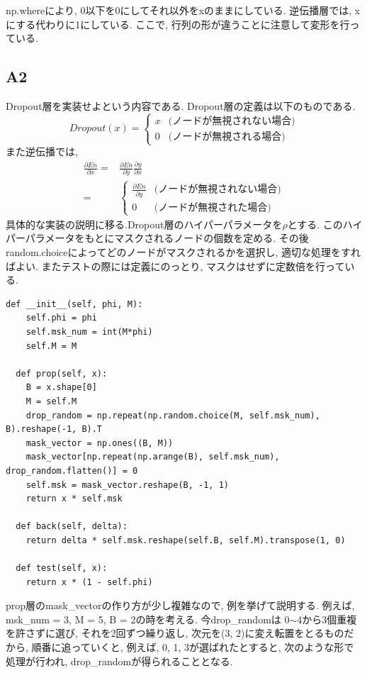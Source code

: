 \documentclass[a4paper,11pt]{jsarticle}
\begin{document}
np.whereにより, 0以下を0にしてそれ以外をxのままにしている.
逆伝播層では, xにする代わりに1にしている. ここで, 行列の形が違うことに注意して変形を行っている.

\subsection{A2}
Dropout層を実装せよという内容である. Dropout層の定義は以下のものである.
\begin{equation}
  Dropout(x) =
  \begin{cases}
    x & \text{(ノードが無視されない場合)} \\
    0 & \text{(ノードが無視される場合)}
  \end{cases}
\end{equation}
また逆伝播では,
\begin{equation}
  \begin{split}
    \frac{\partial En}{\partial x} = & \frac{\partial En}{\partial y}\frac{\partial y}{\partial x}  \\= &
    \begin{cases}
      \frac{\partial En}{\partial y} & \text{(ノードが無視されない場合)} \\
      0                              & \text{(ノードが無視された場合)}
    \end{cases}
  \end{split}
\end{equation}
具体的な実装の説明に移る.Dropout層のハイパーパラメータを$\rho$とする.
このハイパーパラメータをもとにマスクされるノードの個数を定める.
その後random.choiceによってどのノードがマスクされるかを選択し,
適切な処理をすればよい. またテストの際には定義にのっとり,
マスクはせずに定数倍を行っている.
\begin{lstlisting}[caption=Dropout]
  def __init__(self, phi, M):
    self.phi = phi
    self.msk_num = int(M*phi)
    self.M = M

  def prop(self, x):
    B = x.shape[0]
    M = self.M
    drop_random = np.repeat(np.random.choice(M, self.msk_num), B).reshape(-1, B).T
    mask_vector = np.ones((B, M))
    mask_vector[np.repeat(np.arange(B), self.msk_num), drop_random.flatten()] = 0
    self.msk = mask_vector.reshape(B, -1, 1)
    return x * self.msk

  def back(self, delta):
    return delta * self.msk.reshape(self.B, self.M).transpose(1, 0)

  def test(self, x):
    return x * (1 - self.phi)
\end{lstlisting}
prop層のmask\_vectorの作り方が少し複雑なので, 例を挙げて説明する.
例えば, msk\_num = 3, M = 5, B = 2の時を考える. 今drop\_randomは
0$\sim$4から3個重複を許さずに選び, それを2回ずつ繰り返し, 次元を(3, 2)に変え転置をとるものだから, 順番に追っていくと,
例えば, 0, 1, 3が選ばれたとすると, 次のような形で処理が行われ, drop\_randomが得られることとなる.
\end{document}
